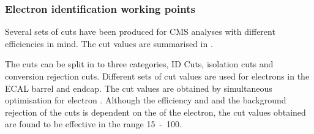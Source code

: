 


\subsubsection{Electron identification working points}

Several sets of cuts have been produced for CMS analyses with different
efficiencies in mind. The cut values are summarised in 
\cite{nikos}.

The cuts can be split in to three categories, ID Cuts, isolation cuts and
conversion rejection cuts. Different sets of cut values are used for electrons in the
ECAL barrel and endcap. The cut values are obtained by simultaneous optimisation
for electron \unit{}{\GeV}. Although the efficiency and and the background
rejection of the cuts is dependent on the \ET of the electron, the cut values
obtained are found to be effective in the range \unit{15-100}{\GeV}.\cite{nikos}

